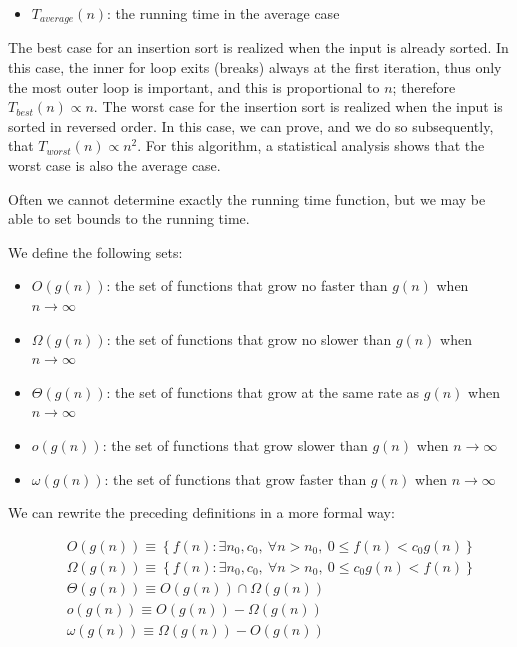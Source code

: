 \documentclass[justified, sixbynine]{tufte-book}
\theoremstyle{plain}%
\newtheorem * {corollary}{Corollary}
\theoremstyle{definition}
\theoremstyle{remark}
\newtheorem * {remark}{Remark}
\newtheorem * {note}{Note}
\begin{document}
\begin{fullwidth}
\begin{itemize}
\item  $T_{average}(n)$: the running time in the average case
\end{itemize}

The best case for an insertion sort is realized when the input is already sorted. In this case, the inner for loop exits (breaks) always at the first iteration, thus only the most outer loop is important, and this is proportional to $n$; therefore $T_{best}(n) \propto n$. The worst case for the insertion sort is realized when the input is sorted in reversed order. In this case, we can prove, and we do so subsequently, that $T_{worst}(n) \propto n^2$. For this algorithm, a statistical analysis shows that the worst case is also the average case.

Often we cannot determine exactly the running time function, but we may be able to set bounds to the running time.

We define the following sets:

\begin{itemize}
\item  $O(g(n))$: the set of functions that grow no faster than $g(n)$ when $%
n\rightarrow \infty $

\item  $\Omega (g(n))$: the set of functions that grow no slower than $g(n)$ when $%
n\rightarrow \infty $

\item  $\Theta (g(n))$: the set of functions that grow at the same rate as $g(n)$ when $%
n\rightarrow \infty $

\item  $o(g(n))$: the set of functions that grow slower than $g(n)$ when $n\rightarrow
\infty $

\item  $\omega (g(n))$: the set of functions that grow faster than $g(n)$ when $n\rightarrow \infty $
\end{itemize}

We can rewrite the preceding definitions in a more formal way:

\begin{eqnarray}
&&O(g(n))\equiv \left\{ f(n):\exists n_0, c_0, \ \forall n>n_0, \
0\leq f(n)<c_0g(n)\right\} \\
&&\Omega (g(n))\equiv \left\{ f(n):\exists n_0, c_0, \ \forall
n>n_0, \ 0\leq c_0g(n)<f(n)\right\} \\
&&\Theta (g(n))\equiv O(g(n))\cap \Omega (g(n)) \\
&&o(g(n))\equiv O(g(n))-\Omega (g(n)) \\
&&\omega (g(n))\equiv \Omega (g(n))-O(g(n))
\end{eqnarray}


\end{fullwidth}
\end{document}
